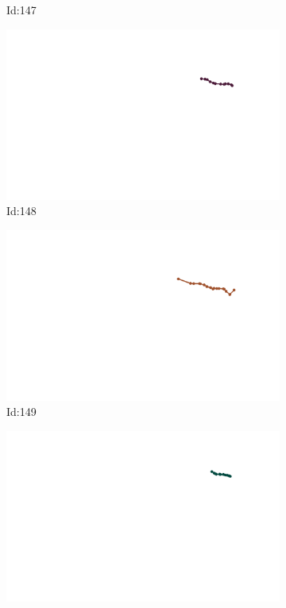 \documentclass[12pt,twoside]{report}
\begin{document}
\begin{figure}
\begin{subfigure}[b]{0.20\textwidth}
\caption{Id:147}
\end{subfigure}
\begin{subfigure}[b]{0.20\textwidth}
\centering
\includegraphics[width=\textwidth]{../../trajectories/148.png}
\caption{Id:148}
\end{subfigure}
\begin{subfigure}[b]{0.20\textwidth}
\centering
\includegraphics[width=\textwidth]{../../trajectories/149.png}
\caption{Id:149}
\end{subfigure}
\begin{subfigure}[b]{0.20\textwidth}
\centering
\includegraphics[width=\textwidth]{../../trajectories/150.png}

\end{subfigure}
\end{figure}
\end{document}

